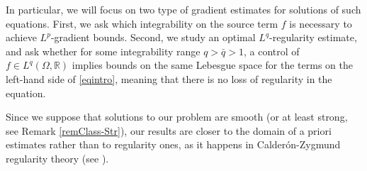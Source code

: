 \documentclass[10pt, a4paper, reqno, oneside]{amsart}
\theoremstyle{plain}
\theoremstyle{definition}
\theoremstyle{plain}
\theoremstyle{definition}
\theoremstyle{plain}
\renewcommand{\=}{:=}
\begin{document}
In particular, we will focus on two type of gradient estimates for solutions of such equations. First, we ask which integrability on the source term $f$ is necessary to achieve $L^p$-gradient bounds. Second, we study an optimal $L^q$-regularity estimate, and ask whether for some integrability range $q>\bar q>1$, a control of $f \in L^{q}(\Omega,\mathbb{R})$ implies bounds on the same Lebesgue space for the terms on the left-hand side of \eqref{eqintro}, meaning that there is no loss of regularity in the equation.

Since we suppose that solutions to our problem are smooth (or at least strong, see Remark \ref{remClass-Str}), our results are closer to the domain of a priori estimates rather than to regularity ones, as it happens in Calder\'on-Zygmund regularity theory (see  \cite[Chapter 9]{GT}).\smallskip
\end{document}
